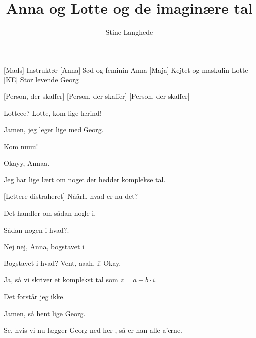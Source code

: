 \documentclass[a4paper,11pt]{article}
\title{Anna og Lotte og de imaginære tal}
\author{Stine Langhede}
\begin{document}
\maketitle

\begin{roles}
[Mads] Instruktør
[Anna] Sød og feminin Anna
[Maja] Kejtet og maskulin Lotte
[KE] Stor levende Georg
\end{roles}

\begin{props}
[Person, der skaffer]
[Person, der skaffer]
[Person, der skaffer]
\end{props}


\begin{sketch}



 Lotteee? Lotte, kom lige herind!

 Jamen, jeg leger lige med Georg.

 Kom nuuu!

 Okayy, Annaa.


 Jeg har lige lært om noget der hedder komplekse tal.

[Lettere distraheret] Nåårh, hvad er nu det?

 Det handler om sådan nogle i.

 Sådan nogen i hvad?.

 Nej nej, Anna, bogstavet i.

 Bogstavet i hvad? Vent, aaah, i!  Okay.

 Ja, så vi skriver et komplekst tal som $z = a + b \cdot i$.

 Det forstår jeg ikke.

 Jamen, så hent lige Georg.



 Se, hvis vi nu lægger Georg ned her , så er han alle a'erne.


\end{sketch}
\end{document}
